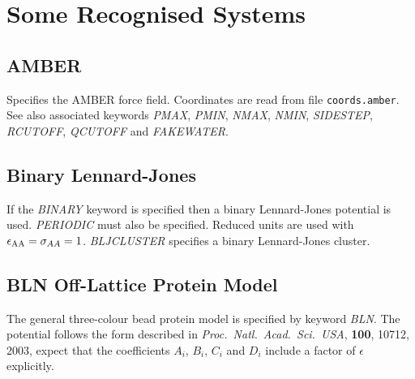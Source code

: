 \documentclass[12pt,a4paper,dvips]{article}
\begin{document}
\section{Some Recognised Systems}

\subsection{AMBER}

Specifies the AMBER force field. Coordinates are read from file {\tt coords.amber}.
See also associated keywords {\it PMAX\/}, {\it PMIN\/}, {\it NMAX\/}, {\it NMIN\/},
{\it SIDESTEP\/}, {\it RCUTOFF\/}, {\it QCUTOFF\/} and {\it FAKEWATER\/}.

\subsection{Binary Lennard-Jones}

If the {\it BINARY\/} keyword is specified then a binary Lennard-Jones
potential is used\cite{sastryds98}. {\it PERIODIC\/} must also be
specified. Reduced units are used with $\epsilon_{\rm AA}=\sigma_{AA}=1$.
{\it BLJCLUSTER\/} specifies a binary Lennard-Jones cluster.

\subsection{BLN Off-Lattice Protein Model}
\label{sec:BLN}

The general three-colour bead protein model is specified by keyword {\it BLN}.
The potential follows the form described in
{\it Proc.~Natl.~Acad.~Sci.~USA}, {\bf 100}, 10712, 2003, expect that
the coefficients $A_i$, $B_i$, $C_i$ and $D_i$ include a factor of $\epsilon$
explicitly.
\end{document}
